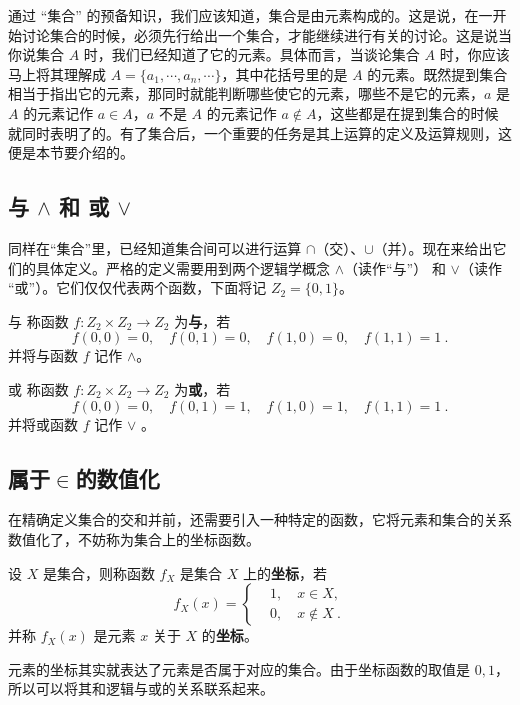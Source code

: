 
通过 “集合” 的预备知识，我们应该知道，集合是由元素构成的。这是说，在一开始讨论集合的时候，必须先行给出一个集合，才能继续进行有关的讨论。这是说当你说集合 $A$ 时，我们已经知道了它的元素。具体而言，当谈论集合 $A$ 时，你应该马上将其理解成 $A=\{a_1,\cdots,a_n,\cdots\}$，其中花括号里的是 $A$ 的元素。既然提到集合相当于指出它的元素，那同时就能判断哪些使它的元素，哪些不是它的元素，$a$ 是 $A$ 的元素记作 $a\in A$，$a$ 不是 $A$ 的元素记作 $a\notin A$，这些都是在提到集合的时候就同时表明了的。有了集合后，一个重要的任务是其上运算的定义及运算规则，这便是本节要介绍的。
\subsection{与 $\land$ 和 或 $\lor$}
同样在“集合”里，已经知道集合间可以进行运算 $\cap$（交）、$\cup$（并）。现在来给出它们的具体定义。严格的定义需要用到两个逻辑学概念 $\land$（读作“与”） 和 $\lor$（读作 “或”）。它们仅仅代表两个函数，下面将记 $Z_2=\{0,1\}$。
\begin{definition}{与}
称函数 $f:Z_2\times Z_2\rightarrow Z_2$ 为\textbf{与}，若
\begin{equation}
f(0,0)=0,\quad f(0,1)=0,\quad f(1,0)=0,\quad f(1,1)=1~.
\end{equation}
并将与函数 $f$ 记作 $\land$。
\end{definition}
\begin{definition}{或}
称函数 $f:Z_2\times Z_2\rightarrow Z_2$ 为\textbf{或}，若
\begin{equation}
f(0,0)=0,\quad f(0,1)=1,\quad f(1,0)=1,\quad f(1,1)=1~.
\end{equation}
并将或函数 $f$ 记作 $\lor$ 。
\end{definition}
\subsection{属于$\in$的数值化}
在精确定义集合的交和并前，还需要引入一种特定的函数，它将元素和集合的关系数值化了，不妨称为集合上的坐标函数。
\begin{definition}{}
设 $X$ 是集合，则称函数 $f_X$ 是集合 $X$ 上的\textbf{坐标}，若
\begin{equation}
f_X(x)=\left\{\begin{aligned}
&1,\quad x\in X,\\
&0,\quad x\notin X~.
\end{aligned}\right.
\end{equation}
并称 $f_X(x)$ 是元素 $x$ 关于 $X$ 的\textbf{坐标}。
\end{definition}
元素的坐标其实就表达了元素是否属于对应的集合。由于坐标函数的取值是 $0,1$，所以可以将其和逻辑与或的关系联系起来。

